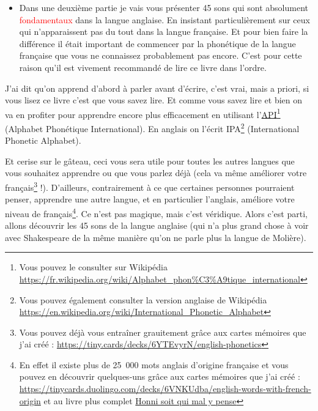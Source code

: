 \begin{itemize}
\item Dans une deuxième partie je vais vous présenter 45 sons qui sont absolument
\textcolor{red}{fondamentaux} dans la langue anglaise. En insistant
particulièrement sur ceux qui n'apparaissent pas du tout dans la
langue française. Et pour bien faire la différence il était important
de commencer par la phonétique de la langue française que vous ne
connaissez probablement pas encore. C'est pour cette raison qu'il est
vivement recommandé de lire ce livre dans l'ordre.
\end{itemize}
J'ai dit qu'on apprend d'abord à parler avant d'écrire, c'est vrai,
mais a priori, si vous lisez ce livre c'est que vous savez lire. Et
comme vous savez lire et bien on va en profiter pour apprendre encore
plus efficacement en utilisant
l'\href{https://fr.wikipedia.org/wiki/Alphabet\_phon\%25C3\%25A9tique\_international}{API}\footnote{Vous
pouvez le consulter sur Wikipédia \url{https://fr.wikipedia.org/wiki/Alphabet_phon\%C3\%A9tique_international}}
(Alphabet Phonétique International). En anglais on l'écrit
IPA\footnote{Vous pouvez également consulter la version anglaise de
  Wikipédia \url{https://en.wikipedia.org/wiki/International_Phonetic_Alphabet}}
(International Phonetic Alphabet).\par

Et cerise sur le gâteau, ceci
vous sera utile pour toutes les autres langues que vous souhaitez
apprendre ou que vous parlez déjà (cela va même améliorer votre
français\footnote{Vous pouvez déjà vous entraîner grauitement grâce
  aux cartes mémoires que j'ai créé : \url{https://tiny.cards/decks/6YTEvyrN/english-phonetics}} !). D'ailleurs, contrairement à ce que certaines personnes
pourraient penser, apprendre une autre langue, et en particulier
l'anglais, améliore votre niveau de français\footnote{En effet il existe plus de 25~000 mots anglais
  d'origine française et vous pouvez en découvrir quelques-uns grâce
  aux cartes mémoires que j'ai créé :
  \url{https://tinycards.duolingo.com/decks/6VNKUdba/english-words-with-french-origin}
et au livre plus complet \href{https://www.amazon.fr/gp/product/225315444X/ref=as_li_tl?ie=UTF8&camp=1642&creative=6746&creativeASIN=225315444X&linkCode=as2&tag=wwwbecomefree-21&linkId=5317e7b0e063b4d6c7c676b11420e49d}{Honni soit qui mal y pense} }. Ce n'est pas magique,
mais c'est véridique. Alors c'est parti, allons découvrir les 45 sons
de la langue anglaise (qui n'a plus grand chose à voir avec
Shakespeare de la même manière qu'on ne parle plus la langue de
Molière).